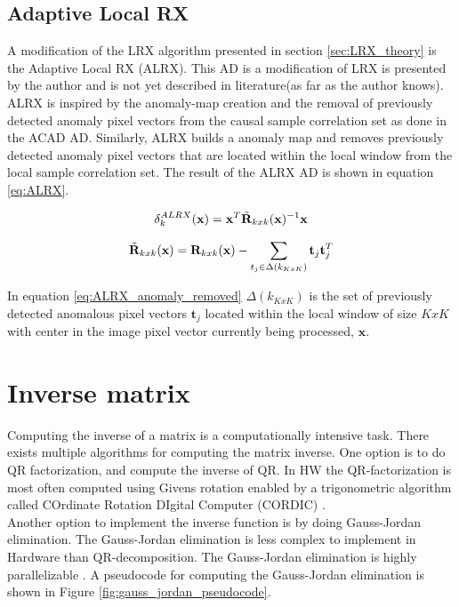 \subsection{Adaptive Local RX}
\label{sec:Adaptive_LRX_theory}
A modification of the LRX algorithm presented in section \ref{sec:LRX_theory} is the Adaptive Local RX (ALRX). This AD is a modification of LRX is presented by the author and is not yet described in literature(as far as the author knows). 
\\

ALRX is inspired by the anomaly-map creation and the removal of previously detected anomaly pixel vectors from the causal sample correlation set as done in the ACAD AD. Similarly, ALRX builds a anomaly map and removes previously detected anomaly pixel vectors that are located within the local window from the local sample correlation set. The result of the ALRX AD is shown in equation \ref{eq:ALRX}. 

\begin{equation}
    \delta_k^{ALRX}(\textbf{x}) = \textbf{x}^T\Tilde{\textbf{R}}_{k x k}(\textbf{x})^{-1}\textbf{x}
    \label{eq:ALRX}
\end{equation}


\begin{equation}
   \Tilde{\textbf{R}}_{k x k}(\textbf{x})= \textbf{R}_{k x k}(\textbf{x})-\sum_{t_j\in\Delta(k_{KxK})}\textbf{t}_j\textbf{t}_j^T
    \label{eq:ALRX_anomaly_removed}
\end{equation}

In equation \ref{eq:ALRX_anomaly_removed} $\Delta(k_{KxK})$ is the set of previously detected anomalous pixel vectors $\textbf{t}_j$ located within the local window of size $KxK$ with center in the image pixel vector currently being processed, $\textbf{x}$.

\section{Inverse matrix}
Computing the inverse of a matrix is a computationally intensive task. There exists multiple algorithms for computing the matrix inverse. One option is to do QR factorization\cite{QRD_fpga}, and compute the inverse of QR. In HW the QR-factorization is most often computed using Givens rotation enabled by a trigonometric algorithm called COrdinate Rotation DIgital Computer (CORDIC) \cite{CORDIC}. \\

Another option to implement the inverse function is by doing Gauss-Jordan elimination. The Gauss-Jordan elimination is less complex to implement in Hardware than QR-decomposition. The Gauss-Jordan elimination is highly parallelizable \cite{gauss_jordan_fpga}. A pseudocode for computing the Gauss-Jordan elimination is shown in Figure \ref{fig:gauss_jordan_pseudocode}.

